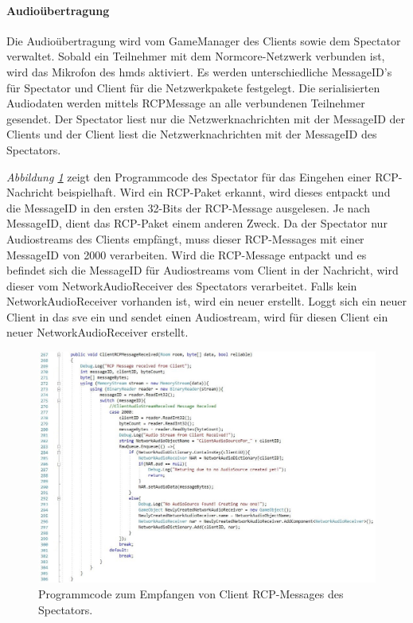 \documentclass[a4paper,11pt]{article}%
\renewcommand{\\}{\vspace*{0.5\baselineskip} \newline}
\begin{document}
{\paragraph{Audioübertragung}
Die Audioübertragung wird vom GameManager des Clients sowie dem Spectator verwaltet. Sobald ein Teilnehmer mit dem Normcore-Netzwerk verbunden ist, wird das Mikrofon des \ac{hmd}s aktiviert. Es werden unterschiedliche MessageID’s für Spectator und Client für die Netzwerkpakete festgelegt. Die serialisierten Audiodaten werden mittels RCPMessage an alle verbundenen Teilnehmer gesendet. Der Spectator liest nur die Netzwerknachrichten mit der MessageID der Clients und der Client liest die Netzwerknachrichten mit der MessageID des Spectators.

\textit{Abbildung \ref{ClientRCPMessageReceived}} zeigt den Programmcode des Spectator für das Eingehen einer RCP-Nachricht beispielhaft. Wird ein RCP-Paket erkannt, wird dieses entpackt und die MessageID in den ersten 32-Bits der RCP-Message ausgelesen. Je nach MessageID, dient das RCP-Paket einem anderen Zweck. Da der Spectator nur Audiostreams des Clients empfängt, muss dieser RCP-Messages mit einer MessageID von \glqq{}2000\dq{} verarbeiten. 
Wird die RCP-Message entpackt und es befindet sich die MessageID für Audiostreams vom Client in der Nachricht, wird dieser vom \glqq{}NetworkAudioReceiver\dq{} des Spectators verarbeitet. Falls kein \glqq{}NetworkAudioReceiver\dq{} vorhanden ist, wird ein neuer erstellt. Loggt sich ein neuer Client in das \ac{sve} ein und sendet einen Audiostream, wird für diesen Client ein neuer \glqq{}NetworkAudioReceiver\dq{} erstellt.

\begin{figure}[H]
		\begin{footnotesize}
		\centering
			\includegraphics[width=\textwidth]{Abbildungen/ClientRCPMessageReceived.jpg}	
			\caption[RCP-Message Handling]{Programmcode zum Empfangen von Client RCP-Messages des Spectators.}
			\label{ClientRCPMessageReceived}
		\end{footnotesize}
	\end{figure}
	
}
\end{document}

